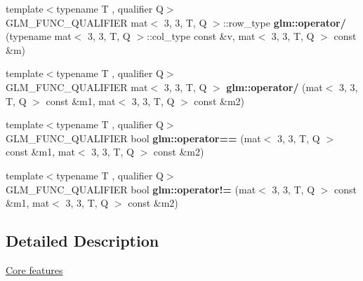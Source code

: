 \begin{DoxyCompactItemize}
\item 
\mbox{\label{type__mat3x3_8inl_a4edac2acd652388ae12afca385e789f3}} 
{\footnotesize template$<$typename T , qualifier Q$>$ }\\G\+L\+M\+\_\+\+F\+U\+N\+C\+\_\+\+Q\+U\+A\+L\+I\+F\+I\+ER mat$<$ 3, 3, T, Q $>$\+::row\+\_\+type {\bfseries glm\+::operator/} (typename mat$<$ 3, 3, T, Q $>$\+::col\+\_\+type const \&v, mat$<$ 3, 3, T, Q $>$ const \&m)
\item 
\mbox{\label{type__mat3x3_8inl_a16b241d81cd3ddeb9bb5d4c5c46d2a7c}} 
{\footnotesize template$<$typename T , qualifier Q$>$ }\\G\+L\+M\+\_\+\+F\+U\+N\+C\+\_\+\+Q\+U\+A\+L\+I\+F\+I\+ER mat$<$ 3, 3, T, Q $>$ {\bfseries glm\+::operator/} (mat$<$ 3, 3, T, Q $>$ const \&m1, mat$<$ 3, 3, T, Q $>$ const \&m2)
\item 
\mbox{\label{type__mat3x3_8inl_a362fcecade24bee02d0d2c337bf7a403}} 
{\footnotesize template$<$typename T , qualifier Q$>$ }\\G\+L\+M\+\_\+\+F\+U\+N\+C\+\_\+\+Q\+U\+A\+L\+I\+F\+I\+ER bool {\bfseries glm\+::operator==} (mat$<$ 3, 3, T, Q $>$ const \&m1, mat$<$ 3, 3, T, Q $>$ const \&m2)
\item 
\mbox{\label{type__mat3x3_8inl_a85363a0968592f80c11f86296d14471d}} 
{\footnotesize template$<$typename T , qualifier Q$>$ }\\G\+L\+M\+\_\+\+F\+U\+N\+C\+\_\+\+Q\+U\+A\+L\+I\+F\+I\+ER bool {\bfseries glm\+::operator!=} (mat$<$ 3, 3, T, Q $>$ const \&m1, mat$<$ 3, 3, T, Q $>$ const \&m2)
\end{DoxyCompactItemize}


\subsection{Detailed Description}
\hyperlink{group__core}{Core features} 